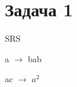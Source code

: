\documentclass[a4paper, 14pt]{extarticle}
\begin{document}

  






 


\renewcommand{\ttdefault}{pcr}

\setlength{\tabcolsep}{3pt}
\newpage
\setcounter{page}{1}

\newpage

\section{Задача 1}

SRS

a $\rightarrow$ bab

ac $\rightarrow$ $a^2$
\end{document}
